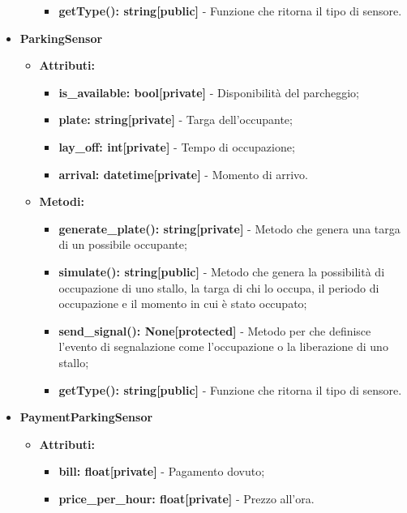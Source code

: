 \documentclass[8pt]{article}
\begin{document}
\begin{itemize}
\begin{itemize}
\begin{itemize}
            \item \textbf{getType(): string[public]} - Funzione che ritorna il tipo di sensore.
        \end{itemize}
    \end{itemize}
    \item \textbf{ParkingSensor}
    \begin{itemize}
        \item \textbf{Attributi:}
        \begin{itemize}
            \item \textbf{is\_available: bool[private]} - Disponibilità del parcheggio;
            \item \textbf{plate: string[private]} - Targa dell'occupante;
            \item \textbf{lay\_off: int[private]} - Tempo di occupazione;
            \item \textbf{arrival: datetime[private]} - Momento di arrivo.
        \end{itemize}
        \item \textbf{Metodi:}
        \begin{itemize}
            \item \textbf{generate\_plate(): string[private]} - Metodo che genera una targa di un possibile occupante;
            \item \textbf{simulate(): string[public]} - Metodo che genera la possibilità di occupazione di uno stallo, la targa di chi lo occupa, il periodo di occupazione e il momento in cui è stato occupato;
            \item \textbf{send\_signal(): None[protected]} - Metodo per che definisce l'evento di segnalazione come l'occupazione o la liberazione di uno stallo;
            \item \textbf{getType(): string[public]} - Funzione che ritorna il tipo di sensore.
        \end{itemize}
    \end{itemize}
    \item \textbf{PaymentParkingSensor}
    \begin{itemize}
        \item \textbf{Attributi:}
        \begin{itemize}
            \item \textbf{bill: float[private]} - Pagamento dovuto;
            \item \textbf{price\_per\_hour: float[private]} - Prezzo all'ora.
        \end{itemize}

\end{itemize}
\end{itemize}
\end{document}
